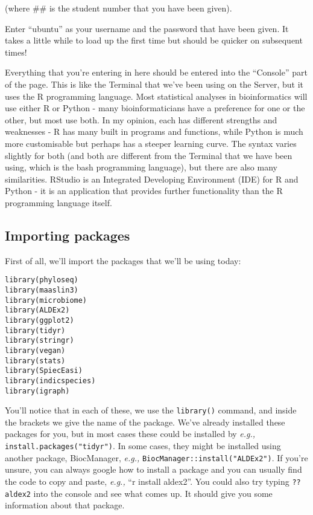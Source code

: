\documentclass[
]{book}
\begin{document}
(where \#\# is the student number that you have been given).

Enter ``ubuntu'' as your username and the password that have been given. It takes a little while to load up the first time but should be quicker on subsequent times!

Everything that you're entering in here should be entered into the ``Console'' part of the page. This is like the Terminal that we've been using on the Server, but it uses the R programming language. Most statistical analyses in bioinformatics will use either R or Python - many bioinformaticians have a preference for one or the other, but most use both. In my opinion, each has different strengths and weaknesses - R has many built in programs and functions, while Python is much more customisable but perhaps has a steeper learning curve. The syntax varies slightly for both (and both are different from the Terminal that we have been using, which is the bash programming language), but there are also many similarities. RStudio is an Integrated Developing Environment (IDE) for R and Python - it is an application that provides further functionality than the R programming language itself.

\subsection{Importing packages}\label{importing-packages}

First of all, we'll import the packages that we'll be using today:

\begin{verbatim}
library(phyloseq)
library(maaslin3)
library(microbiome)
library(ALDEx2)
library(ggplot2)
library(tidyr)
library(stringr)
library(vegan)
library(stats)
library(SpiecEasi)
library(indicspecies)
library(igraph)
\end{verbatim}

You'll notice that in each of these, we use the \texttt{library()} command, and inside the brackets we give the name of the package. We've already installed these packages for you, but in most cases these could be installed by \emph{e.g.,} \texttt{install.packages("tidyr")}. In some cases, they might be installed using another package, BiocManager, \emph{e.g.,} \texttt{BiocManager::install("ALDEx2")}. If you're unsure, you can always google how to install a package and you can usually find the code to copy and paste, \emph{e.g.,} ``r install aldex2''. You could also try typing \texttt{??aldex2} into the console and see what comes up. It should give you some information about that package.
\end{document}
